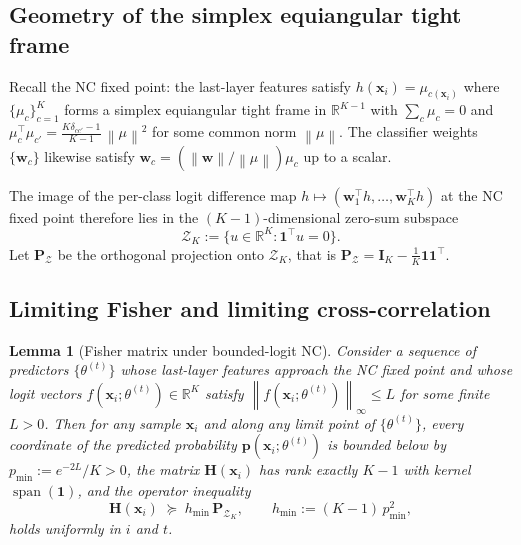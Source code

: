 \documentclass[12pt]{amsart}
\newtheorem{lemma}[theorem]{Lemma}
\theoremstyle{definition}
\theoremstyle{remark}
\DeclareMathOperator{\spn}{span}
\newcommand{\R}{\mathbb{R}}
\newcommand{\bx}{\mathbf{x}}
\newcommand{\bI}{\mathbf{I}}
\newcommand{\bw}{\mathbf{w}}
\newcommand{\bp}{\mathbf{p}}
\newcommand{\bH}{\mathbf{H}}
\newcommand{\bP}{\mathbf{P}}
\newcommand{\norm}[1]{\left\lVert #1 \right\rVert}
\begin{document}
\subsection{Geometry of the simplex equiangular tight frame}

Recall the NC fixed point: the last-layer features satisfy
$h(\bx_{i}) = \mu_{c(\bx_{i})}$ where $\{\mu_{c}\}_{c=1}^{K}$
forms a simplex equiangular tight frame in $\R^{K-1}$ with
$\sum_{c}\mu_{c} = 0$ and
$\mu_{c}^{\top}\mu_{c'} = \tfrac{K\delta_{cc'} - 1}{K-1}\,\norm{\mu}^{2}$
for some common norm $\norm{\mu}$. The classifier weights
$\{\bw_{c}\}$ likewise satisfy
$\bw_{c} = (\norm{\bw}/\norm{\mu})\mu_{c}$ up to a scalar.

The image of the per-class logit difference map
$h \mapsto (\bw_{1}^{\top}h,\ldots,\bw_{K}^{\top}h)$ at the NC fixed
point therefore lies in the $(K-1)$-dimensional zero-sum subspace
\[
  \mathcal{Z}_{K} := \{u \in \R^{K} : \mathbf{1}^{\top}u = 0\}.
\]
Let $\bP_{\mathcal{Z}}$ be the orthogonal projection onto
$\mathcal{Z}_{K}$, that is
$\bP_{\mathcal{Z}} = \bI_{K} - \tfrac{1}{K}\mathbf{1}\mathbf{1}^{\top}$.

\subsection{Limiting Fisher and limiting cross-correlation}

\begin{lemma}[Fisher matrix under bounded-logit NC]\label{lem:H-NC}
Consider a sequence of predictors $\{\theta^{(t)}\}$ whose
last-layer features approach the NC fixed point and whose logit
vectors $f(\bx_{i};\theta^{(t)}) \in \R^{K}$ satisfy
$\norm{f(\bx_{i};\theta^{(t)})}_{\infty} \leq L$ for some finite
$L > 0$. Then for any sample $\bx_{i}$ and along any limit point of
$\{\theta^{(t)}\}$, every coordinate of the predicted probability
$\bp(\bx_{i};\theta^{(t)})$ is bounded below by
$p_{\min} := e^{-2L}/K > 0$, the matrix $\bH(\bx_{i})$ has rank
exactly $K-1$ with kernel $\spn(\mathbf{1})$, and the operator
inequality
\[
  \bH(\bx_{i}) \;\succeq\; h_{\min}\,\bP_{\mathcal{Z}_{K}},
  \qquad h_{\min} := (K-1)\,p_{\min}^{2},
\]
holds uniformly in $i$ and $t$.
\end{lemma}
\end{document}
